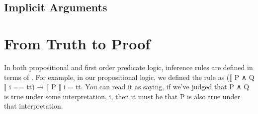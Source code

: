 \documentclass[letterpaper,10pt,english]{sphinxmanual}
\begin{document}
\subsection{Implicit Arguments}
\label{\detokenize{A_02_Constructive_Logic:implicit-arguments}}
\begin{sphinxVerbatim}[commandchars=\\\{\}]
            

  
  
  \PYG{o}{[}\PYG{o}{]}

   
   
    \PYG{o}{[}\PYG{o}{]}
\end{sphinxVerbatim}


\section{From Truth to Proof}
\label{\detokenize{A_02_Constructive_Logic:from-truth-to-proof}}
\sphinxAtStartPar
In both propositional and first order predicate logic,
inference rules are defined in terms of .
For example, in our propositional logic, we defined the
 rule as (⟦ P ∧ Q ⟧ i == tt) →
⟦ P ⟧ i = tt. You can read it as saying, if we’ve judged
that P ∧ Q is true under some interpretation, i, then it
must be that P is also true under that interpretation.
\end{document}
